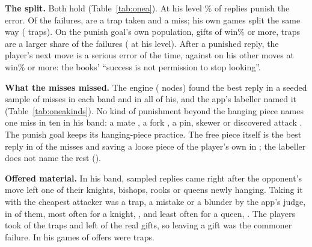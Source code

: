 \documentclass[11pt]{article}
\begin{document}
\textbf{The split.} Both hold (Table~\ref{tab:onea}). At his level \OneAHisPunished\% of replies
punish the error. Of the failures, \OneAHisTrapOfFailures{} are a trap taken and
\OneAHisMissedOfFailures{} a miss; his own games split the same way (\OneAArchiveTrapOfFailures{}
traps). On the punish goal's own population, gifts of \GiftFloor{} win\% or more, traps are a larger share
of the failures (\OneAHisGiftTrapOfFailures{} at his level). After a punished reply, the player's next
move is a serious error \OneAHisNextSerious{} of the time, against \OneAHisHighOtherSerious{} on his
other moves at \HighWp{} win\% or more: the books' ``success is not permission to stop looking''.

\begin{table}[h]
\centering
\scriptsize\OneATable
\caption{The reply to the opponent's serious error.}
\label{tab:onea}
\end{table}

\textbf{What the misses missed.} The engine (\BestNodes{} nodes) found the best reply in a seeded
sample of \OneAHisMissesSearched{} misses in each band and in all \OneAArchiveMissesSearched{} of
his, and the app's labeller named it (Table~\ref{tab:oneakinds}). No kind of punishment beyond the
hanging piece names one miss in ten in his band: a mate \OneAHisKindMate, a fork \OneAHisKindFork,
a pin, skewer or discovered attack \OneAHisKindPinSkewerDiscovered. The punish goal keeps its
hanging-piece practice. The free piece itself is the best reply in \OneAHisKindHangingPiece{} of the
misses and saving a loose piece of the player's own in \OneAHisKindDefensiveMove; the labeller does
not name the rest (\OneAHisKindUnnamed).

\begin{table}[h]
\centering
\scriptsize\OneAKindsTable
\caption{The engine's best reply in the position the opponent's serious error left, where the player
missed the punishment, as the app's labeller names it.}
\label{tab:oneakinds}
\end{table}

\textbf{Offered material.} In his band, \OneAHisOfferedSearched{} sampled replies came right after
the opponent's move left one of their knights, bishops, rooks or queens newly hanging. Taking it with
the cheapest attacker was a trap, a mistake or a blunder by the app's judge, in
\OneAHisOfferedTraps{} of them, most often for a knight, \OneAHisOfferedTrapKnight, and least
often for a queen, \OneAHisOfferedTrapQueen. The players took \OneAHisTookTrap{} of the traps and left
\OneAHisLeftGift{} of the real gifts, so leaving a gift was the commoner failure. In his games
\OneAArchiveOfferedTraps{} of \OneAArchiveOfferedSearched{} offers were traps.
\end{document}
